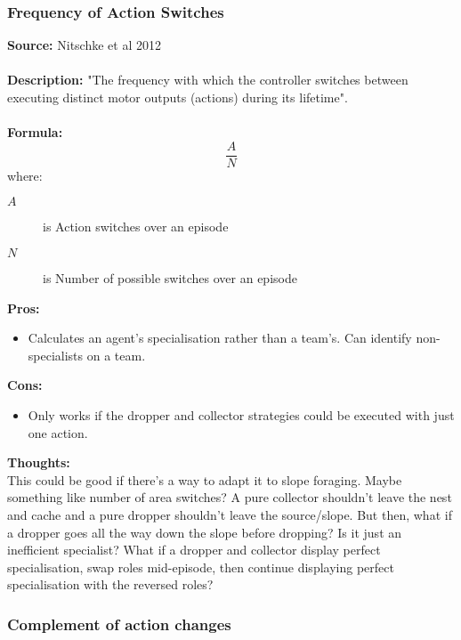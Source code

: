 \documentclass[12pt]{article}
\begin{document}
\subsubsection{Frequency of Action Switches}
\textbf{Source: } Nitschke et al 2012 \cite{nitschke:SEC:2012} \\\\
\textbf{Description: } "The frequency with which the controller switches between executing distinct motor outputs (actions) during its lifetime".\\\\
\textbf{Formula: }\\
%
\[
\frac{A}{N}
\]
%
where:
\begin{description}
\item[$A$] is Action switches over an episode
\item[$N$] is Number of possible switches over an episode
\end{description}
\textbf{Pros:}
\begin{itemize}
\item Calculates an agent's specialisation rather than a team's. Can identify non-specialists on a team.
\end{itemize}
\textbf{Cons:}
\begin{itemize}
\item Only works if the dropper and collector strategies could be executed with just one action.
\end{itemize}
\textbf{Thoughts:}\\
This could be good if there's a way to adapt it to slope foraging.
Maybe something like number of area switches?
A pure collector shouldn't leave the nest and cache and a pure dropper shouldn't leave the source/slope.
But then, what if a dropper goes all the way down the slope before dropping?
Is it just an inefficient specialist?
What if a dropper and collector display perfect specialisation,  swap roles mid-episode, then continue displaying perfect specialisation with the reversed roles?

\subsubsection{Complement of action changes}
\end{document}

